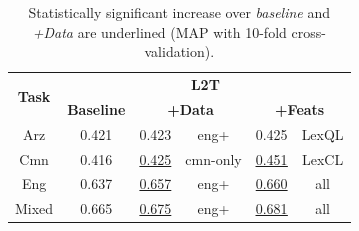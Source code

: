 \documentclass{sig-alternate-05-2015}
\begin{document}
\begin{table}[h]
\begin{small}
\centering
\begin{tabular}{|c|c|c|c|c|c|}
\hline
\multirow{2}{*}{\textbf{Task}} & \multicolumn{5}{|c|}{\textbf{L2T}}  \\ \cline{2-6}
	& \textbf{Baseline} & \multicolumn{2}{c|}{\textbf{+Data}} & \multicolumn{2}{c|}{\textbf{+Feats}}  \\ \hline
Arz & 0.421 & 0.423 & eng+ & { 0.425 } & LexQL   \\ \cline{1-6}
Cmn & 0.416 & \underline{0.425} & cmn-only & \underline{\underline{ 0.451 }} & LexCL  \\ \cline{1-6}
Eng & 0.637 & \underline{0.657} & eng+ & \underline{ 0.660 } & all  \\ \hline
Mixed & 0.665 & \underline{0.675} & eng+ & \underline{\underline{ 0.681} } & all \\ \hline
\end{tabular}
\caption{{\small Statistically significant increase over \emph{baseline} and \emph{+Data} are underlined 
(MAP with 10-fold cross-validation).}}
\label{tab:controlled}
\end{small}

\end{table}

 

\end{document}
